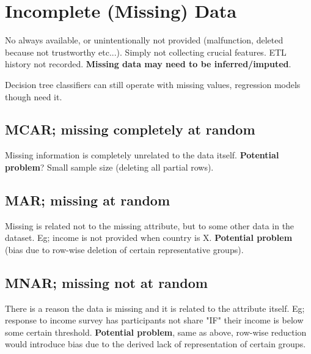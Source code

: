 \documentclass{article}
\begin{document}
\section{Incomplete (Missing) Data}
No always available, or unintentionally not provided (malfunction, deleted because not trustworthy etc...). Simply not collecting crucial features. ETL history not recorded. {\bf Missing data may need to be inferred/imputed}.

Decision tree classifiers can still operate with missing values, regression models though need it.

\subsection{MCAR; missing completely at random}
Missing information is completely unrelated to the data itself. {\bf Potential problem}? Small sample size (deleting all partial rows).

\subsection{MAR; missing at random}
Missing is related not to the missing attribute, but to some other data in the dataset. Eg; income is not provided when country is X. {\bf Potential problem} (bias due to row-wise deletion of certain representative groups).

\subsection{MNAR; missing not at random}
There is a reason the data is missing and it is related to the attribute itself. Eg; response to income survey has participants not share "IF" their income is below some certain threshold. {\bf Potential problem}, same as above, row-wise reduction would introduce bias due to the derived lack of representation of certain groups.
\end{document}
